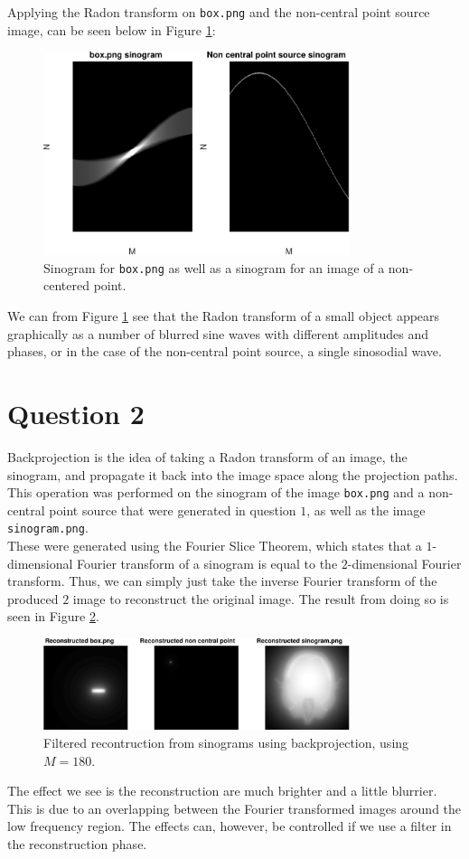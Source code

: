 \documentclass[a4paper]{article}
\begin{document}
Applying the Radon transform on \texttt{box.png} and the non-central point source image, can be seen below in Figure \ref{1b}:
\begin{figure}[H]
  \centering
  \includegraphics[width=0.8\textwidth]{./1b.pdf}
  \caption{Sinogram for \texttt{box.png} as well as a sinogram for an image of a non-centered point.}
  \label{1b}
\end{figure}
We can from Figure \ref{1b} see that the Radon transform of a small object appears graphically as a number of blurred sine waves with different amplitudes and phases, or in the case of the non-central point source, a single sinosodial wave.
\FloatBarrier

\section*{Question 2}
Backprojection is the idea of taking a Radon transform of an image, the sinogram, and propagate it back into the image space along the projection paths. This operation was performed on the sinogram of the image \texttt{box.png} and a non-central point source that were generated in question $1$, as well as the image \texttt{sinogram.png}. \\
These were generated using the Fourier Slice Theorem, which states that a $1$-dimensional Fourier transform of a sinogram is equal to the $2$-dimensional Fourier transform. Thus, we can simply just take the inverse Fourier transform of the produced $2$ image to reconstruct the original image. The result from doing so is seen in Figure \ref{2}.
\begin{figure}[H]
  \centering
  \captionsetup{justification=centering}
  \includegraphics[width=0.8\textwidth]{./2.pdf}
  \caption{Filtered recontruction from sinograms using backprojection, using $M=180$.}
  \label{2}
\end{figure}
The effect we see is the reconstruction are much brighter and a little blurrier. This is due to an overlapping between the Fourier transformed images around the low frequency region. The effects can, however, be controlled if we use a filter in the reconstruction phase.
\end{document}
